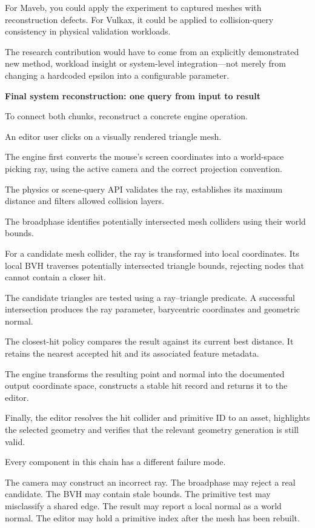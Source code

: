 For Maveb, you could apply the experiment to captured meshes with reconstruction defects. For Vulkax, it could be applied to collision-query consistency in physical validation workloads.

The research contribution would have to come from an explicitly demonstrated new method, workload insight or system-level integration---not merely from changing a hardcoded epsilon into a configurable parameter.

\textbf{Final system reconstruction: one query from input to result}

To connect both chunks, reconstruct a concrete engine operation.

An editor user clicks on a visually rendered triangle mesh.

The engine first converts the mouse's screen coordinates into a world-space picking ray, using the active camera and the correct projection convention.

The physics or scene-query API validates the ray, establishes its maximum distance and filters allowed collision layers.

The broadphase identifies potentially intersected mesh colliders using their world bounds.

For a candidate mesh collider, the ray is transformed into local coordinates. Its local BVH traverses potentially intersected triangle bounds, rejecting nodes that cannot contain a closer hit.

The candidate triangles are tested using a ray--triangle predicate. A successful intersection produces the ray parameter, barycentric coordinates and geometric normal.

The closest-hit policy compares the result against its current best distance. It retains the nearest accepted hit and its associated feature metadata.

The engine transforms the resulting point and normal into the documented output coordinate space, constructs a stable hit record and returns it to the editor.

Finally, the editor resolves the hit collider and primitive ID to an asset, highlights the selected geometry and verifies that the relevant geometry generation is still valid.

Every component in this chain has a different failure mode.

The camera may construct an incorrect ray. The broadphase may reject a real candidate. The BVH may contain stale bounds. The primitive test may misclassify a shared edge. The result may report a local normal as a world normal. The editor may hold a primitive index after the mesh has been rebuilt.

